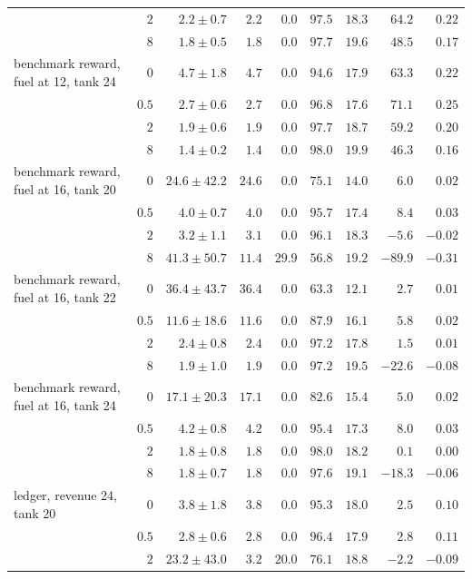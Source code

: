 \begin{tabular}{lrrrrrrrr}
 & $2$ & $2.2\pm0.7$ & $2.2$ & $0.0$ & $97.5$ & $18.3$ & $64.2$ & $0.22$ \\
 & $8$ & $1.8\pm0.5$ & $1.8$ & $0.0$ & $97.7$ & $19.6$ & $48.5$ & $0.17$ \\
\addlinespace
benchmark reward, fuel at 12, tank 24 & $0$ & $4.7\pm1.8$ & $4.7$ & $0.0$ & $94.6$ & $17.9$ & $63.3$ & $0.22$ \\
 & $0.5$ & $2.7\pm0.6$ & $2.7$ & $0.0$ & $96.8$ & $17.6$ & $71.1$ & $0.25$ \\
 & $2$ & $1.9\pm0.6$ & $1.9$ & $0.0$ & $97.7$ & $18.7$ & $59.2$ & $0.20$ \\
 & $8$ & $1.4\pm0.2$ & $1.4$ & $0.0$ & $98.0$ & $19.9$ & $46.3$ & $0.16$ \\
\addlinespace
benchmark reward, fuel at 16, tank 20 & $0$ & $24.6\pm42.2$ & $24.6$ & $0.0$ & $75.1$ & $14.0$ & $6.0$ & $0.02$ \\
 & $0.5$ & $4.0\pm0.7$ & $4.0$ & $0.0$ & $95.7$ & $17.4$ & $8.4$ & $0.03$ \\
 & $2$ & $3.2\pm1.1$ & $3.1$ & $0.0$ & $96.1$ & $18.3$ & $-5.6$ & $-0.02$ \\
 & $8$ & $41.3\pm50.7$ & $11.4$ & $29.9$ & $56.8$ & $19.2$ & $-89.9$ & $-0.31$ \\
\addlinespace
benchmark reward, fuel at 16, tank 22 & $0$ & $36.4\pm43.7$ & $36.4$ & $0.0$ & $63.3$ & $12.1$ & $2.7$ & $0.01$ \\
 & $0.5$ & $11.6\pm18.6$ & $11.6$ & $0.0$ & $87.9$ & $16.1$ & $5.8$ & $0.02$ \\
 & $2$ & $2.4\pm0.8$ & $2.4$ & $0.0$ & $97.2$ & $17.8$ & $1.5$ & $0.01$ \\
 & $8$ & $1.9\pm1.0$ & $1.9$ & $0.0$ & $97.2$ & $19.5$ & $-22.6$ & $-0.08$ \\
\addlinespace
benchmark reward, fuel at 16, tank 24 & $0$ & $17.1\pm20.3$ & $17.1$ & $0.0$ & $82.6$ & $15.4$ & $5.0$ & $0.02$ \\
 & $0.5$ & $4.2\pm0.8$ & $4.2$ & $0.0$ & $95.4$ & $17.3$ & $8.0$ & $0.03$ \\
 & $2$ & $1.8\pm0.8$ & $1.8$ & $0.0$ & $98.0$ & $18.2$ & $0.1$ & $0.00$ \\
 & $8$ & $1.8\pm0.7$ & $1.8$ & $0.0$ & $97.6$ & $19.1$ & $-18.3$ & $-0.06$ \\
\addlinespace
ledger, revenue 24, tank 20 & $0$ & $3.8\pm1.8$ & $3.8$ & $0.0$ & $95.3$ & $18.0$ & $2.5$ & $0.10$ \\
 & $0.5$ & $2.8\pm0.6$ & $2.8$ & $0.0$ & $96.4$ & $17.9$ & $2.8$ & $0.11$ \\
 & $2$ & $23.2\pm43.0$ & $3.2$ & $20.0$ & $76.1$ & $18.8$ & $-2.2$ & $-0.09$ \\

\end{tabular}
